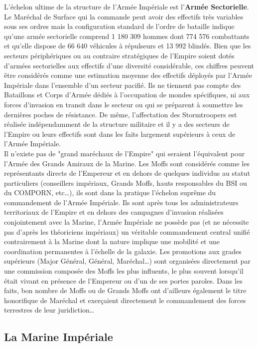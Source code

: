 \documentclass[twoside]{article}
\begin{document}
L'échelon ultime de la structure de l'Armée Impériale est l'\textbf{Armée Sectorielle}. Le Maréchal de Surface qui la commande peut avoir des effectifs très variables sous ses ordres mais la configuration standard de l'ordre de bataille indique qu'une armée sectorielle comprend 1 180 309 hommes dont 774 576 combattants et qu'elle dispose de 66 640 véhicules à répulseurs et 13 992 blindés. Bien que les secteurs périphériques ou au contraire stratégiques de l'Empire soient dotés d'armées sectorielles aux effectifs d'une diversité considérable, ces chiffres peuvent être considérés comme une estimation moyenne des effectifs déployés par l'Armée Impériale dans l'ensemble d'un secteur pacifié. Ils ne tiennent pas compte des Bataillons et Corps d'Armée dédiés à l'occupation de mondes spécifiques, ni aux forces d'invasion en transit dans le secteur ou qui se préparent à soumettre les dernières poches de résistance. De même, l'affectation des Stormtroopers est réalisée indépendamment de la structure militaire et il y a des secteurs de l'Empire ou leurs effectifs sont dans les faits largement supérieurs à ceux de l'Armée Impériale.\\

Il n'existe pas de "grand maréchaux de l'Empire" qui seraient l'équivalent pour l'Armée des Grands Amiraux de la Marine. Les Moffs sont considérés comme les représentants directs de l'Empereur et en dehors de quelques individus au statut particuliers (conseillers impériaux, Grands Moffs, hauts responsables du BSI ou du COMPORN, etc\ldots), ils sont dans la pratique l'échelon suprême du commandement de l'Armée Impériale. Ils sont après tous les administrateurs territoriaux de l'Empire et en dehors des campagnes d'invasion réalisées conjointement avec la Marine, l'Armée Impériale ne possède pas (et ne nécessite pas d'après les théoriciens impériaux) un véritable commandement central unifié contrairement à la Marine dont la nature implique une mobilité et une coordination permanentes à l'échelle de la galaxie. Les promotions aux grades supérieurs (Major Général, Général, Maréchal\ldots) sont organisées directement par une commission composée des Moffs les plus influents, le plus souvent lorsqu'il était vivant en présence de l'Empereur ou d'un de ses portes paroles. Dans les faits, bon nombre de Moffs ou de Grands Moffs ont d'ailleurs également le titre honorifique de Maréchal et exerçaient directement le commandement des forces terrestres de leur juridiction\ldots

\subsection{La Marine Impériale}
\end{document}
